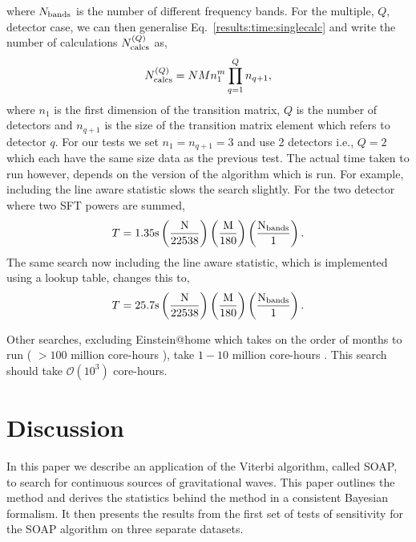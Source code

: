 where  $N_{\rm{bands}}$ is the number of different frequency
bands.
For the multiple, $Q$, detector case, we can then generalise Eq.~\ref{results:time:singlecalc} and write the number of calculations $N^{(Q)}_{\rm{calcs}}$ as,
\begin{equation}
\label{results:time:numbercalcs}
N^{(Q)}_{\rm{calcs}} = NMn_{1}^{m} \prod_{q=1}^{Q}n_{q+1},
\end{equation}
where $n_1$ is the first dimension of the transition matrix, $Q$ is the number of detectors and $n_{q+1}$ is the size of the transition matrix element which refers to detector $q$.
For our tests we set $n_1=n_{q+1}=3$ and use 2 detectors i.e., $Q=2$ which each have the same size data as the previous test. The actual time taken to run however, depends on the version of the algorithm which is run. For example, including the line aware statistic slows the search slightly.
For the two detector where two \ac{SFT} powers are summed,
\begin{equation}
T = 1.35 \rm{s}\left( \frac{N}{22538}\right) \left( \frac{M}{180}\right) \left( \frac{N_{\rm{bands}}}{1}\right).
\end{equation}
The same search now including the line aware statistic, which is implemented using a lookup table, changes this to,
\begin{equation}
T = 25.7 \rm{s}\left( \frac{N}{22538}\right) \left( \frac{M}{180}\right) \left( \frac{N_{\rm{bands}}}{1}\right).
\end{equation}

Other searches, excluding Einstein@home which takes on the order of months to run ( $>100$ million core-hours \citep{walsh2016ComparisonMethods}), take $1-10$ million core-hours \citep{walsh2016ComparisonMethods}. This search should take $\mathcal{O}(10^3)$ core-hours.

\section{\label{dicussion}Discussion}

In this paper we describe an application of the Viterbi algorithm, called SOAP, to
search for continuous sources of gravitational waves.
This paper outlines the method and derives the statistics behind the method in a consistent Bayesian formalism. It then presents the results from the first set of tests of sensitivity for the SOAP algorithm on three separate datasets.

